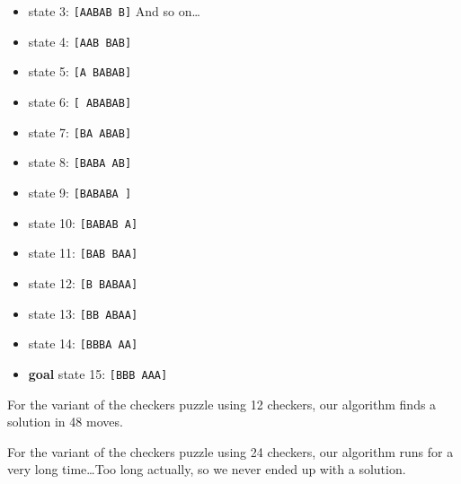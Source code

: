 \documentclass{article}
\begin{document}
\begin{itemize}
  \item state  3: \texttt{[AABAB B]}
  And so on\ldots

  \item state  4: \texttt{[AAB BAB]}
  \item state  5: \texttt{[A BABAB]}
  \item state  6: \texttt{[ ABABAB]}
  \item state  7: \texttt{[BA ABAB]}
  \item state  8: \texttt{[BABA AB]}  
  \item state  9: \texttt{[BABABA ]}  
  \item state 10: \texttt{[BABAB A]}  
  \item state 11: \texttt{[BAB BAA]}  
  \item state 12: \texttt{[B BABAA]}  
  \item state 13: \texttt{[BB ABAA]}  
  \item state 14: \texttt{[BBBA AA]}  
  \item \textbf{goal} state 15: \texttt{[BBB AAA]}
\end{itemize}


For the variant of the checkers puzzle using 12 checkers, our algorithm finds a
solution in 48 moves.

For the variant of the checkers puzzle using 24 checkers, our algorithm runs for
a very long time\ldots Too long actually, so we never ended up with a solution.
\end{document}
